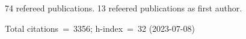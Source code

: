 74 refereed publications. 13 refeered publications as first author.

Total citations~=~3356; h-index~=~32 (2023-07-08)